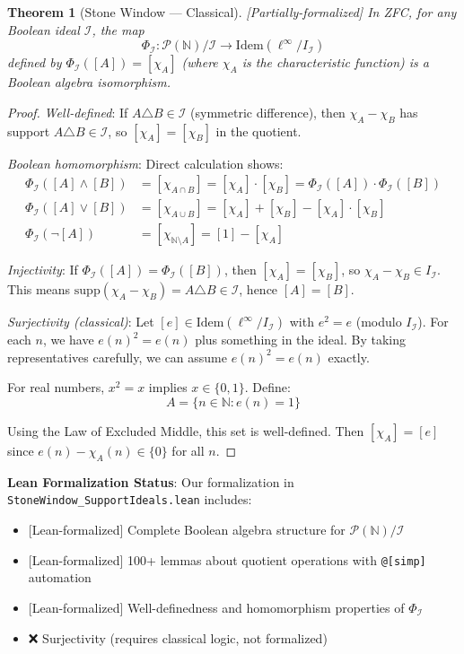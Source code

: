 \documentclass[11pt]{article}
\theoremstyle{plain}
\newtheorem{theorem}{Theorem}[section]
\theoremstyle{definition}
\newcommand{\N}{\mathbb{N}}
\newcommand{\linf}{\ell^\infty}
\newcommand{\leanok}{\textsf{\textcolor{green!70!black}{[Lean-formalized]}}}
\newcommand{\leanpartial}{\textsf{\textcolor{purple!70!black}{[Partially-formalized]}}}
\begin{document}
\begin{theorem}[Stone Window — Classical]\label{thm:stone-classical} \leanpartial
In ZFC, for any Boolean ideal $\mathcal{I}$, the map
\[
\Phi_{\mathcal{I}}: \mathcal{P}(\N)/\mathcal{I} \to \text{Idem}(\linf/I_{\mathcal{I}})
\]
defined by $\Phi_{\mathcal{I}}([A]) = [\chi_A]$ (where $\chi_A$ is the characteristic function) is a Boolean algebra isomorphism.
\end{theorem}

\begin{proof}
\emph{Well-defined}: If $A \triangle B \in \mathcal{I}$ (symmetric difference), then $\chi_A - \chi_B$ has support $A \triangle B \in \mathcal{I}$, so $[\chi_A] = [\chi_B]$ in the quotient.

\emph{Boolean homomorphism}: Direct calculation shows:
\begin{align}
\Phi_{\mathcal{I}}([A] \wedge [B]) &= [\chi_{A \cap B}] = [\chi_A] \cdot [\chi_B] = \Phi_{\mathcal{I}}([A]) \cdot \Phi_{\mathcal{I}}([B])\\
\Phi_{\mathcal{I}}([A] \vee [B]) &= [\chi_{A \cup B}] = [\chi_A] + [\chi_B] - [\chi_A] \cdot [\chi_B]\\
\Phi_{\mathcal{I}}(\neg[A]) &= [\chi_{\N \setminus A}] = [1] - [\chi_A]
\end{align}

\emph{Injectivity}: If $\Phi_{\mathcal{I}}([A]) = \Phi_{\mathcal{I}}([B])$, then $[\chi_A] = [\chi_B]$, so $\chi_A - \chi_B \in I_{\mathcal{I}}$. This means $\text{supp}(\chi_A - \chi_B) = A \triangle B \in \mathcal{I}$, hence $[A] = [B]$.

\emph{Surjectivity (classical)}: Let $[e] \in \text{Idem}(\linf/I_{\mathcal{I}})$ with $e^2 = e$ (modulo $I_{\mathcal{I}}$). For each $n$, we have $e(n)^2 = e(n)$ plus something in the ideal. By taking representatives carefully, we can assume $e(n)^2 = e(n)$ exactly.

For real numbers, $x^2 = x$ implies $x \in \{0, 1\}$. Define:
\[
A = \{n \in \N : e(n) = 1\}
\]

Using the Law of Excluded Middle, this set is well-defined. Then $[\chi_A] = [e]$ since $e(n) - \chi_A(n) \in \{0\}$ for all $n$.
\end{proof}

\begin{formalbox}
\textbf{Lean Formalization Status}: Our formalization in \texttt{StoneWindow\_SupportIdeals.lean} includes:
\begin{itemize}
\item \leanok{} Complete Boolean algebra structure for $\mathcal{P}(\N)/\mathcal{I}$
\item \leanok{} 100+ lemmas about quotient operations with \texttt{@[simp]} automation
\item \leanok{} Well-definedness and homomorphism properties of $\Phi_{\mathcal{I}}$
\item ❌ Surjectivity (requires classical logic, not formalized)
\end{itemize}
\end{formalbox}
\end{document}
